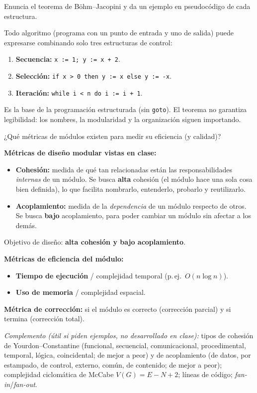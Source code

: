 \begin{prob}
Enuncia el teorema de Böhm--Jacopini y da un ejemplo en pseudocódigo de cada estructura.
\end{prob}
\begin{sol}
Todo algoritmo (programa con un punto de entrada y uno de salida) puede expresarse combinando solo tres estructuras de control:
\begin{enumerate}
\item \textbf{Secuencia:} \texttt{x := 1; y := x + 2}.
\item \textbf{Selección:} \texttt{if x > 0 then y := x else y := -x}.
\item \textbf{Iteración:} \texttt{while i < n do i := i + 1}.
\end{enumerate}
Es la base de la programación estructurada (sin \texttt{goto}). El teorema no garantiza legibilidad: los nombres, la modularidad y la organización siguen importando.
\end{sol}

\begin{prob}[\examen]
¿Qué métricas de módulos existen para medir su eficiencia (y calidad)?
\end{prob}
\begin{sol}
\textbf{Métricas de diseño modular vistas en clase:}
\begin{itemize}
\item \textbf{Cohesión:} medida de qué tan relacionadas están las responsabilidades \emph{internas} de un módulo. Se busca \textbf{alta} cohesión (el módulo hace una sola cosa bien definida), lo que facilita nombrarlo, entenderlo, probarlo y reutilizarlo.
\item \textbf{Acoplamiento:} medida de la \emph{dependencia} de un módulo respecto de otros. Se busca \textbf{bajo} acoplamiento, para poder cambiar un módulo sin afectar a los demás.
\end{itemize}
Objetivo de diseño: \textbf{alta cohesión y bajo acoplamiento}.

\textbf{Métricas de eficiencia del módulo:}
\begin{itemize}
\item \textbf{Tiempo de ejecución} / complejidad temporal (p.\,ej.\ $O(n\log n)$).
\item \textbf{Uso de memoria} / complejidad espacial.
\end{itemize}
\textbf{Métrica de corrección:} si el módulo es correcto (corrección parcial) y si termina (corrección total).

\emph{Complemento (útil si piden ejemplos, no desarrollado en clase):} tipos de cohesión de Yourdon--Constantine (funcional, secuencial, comunicacional, procedimental, temporal, lógica, coincidental; de mejor a peor) y de acoplamiento (de datos, por estampado, de control, externo, común, de contenido; de mejor a peor); complejidad ciclomática de McCabe $V(G)=E-N+2$; líneas de código; \emph{fan-in}/\emph{fan-out}.
\end{sol}

